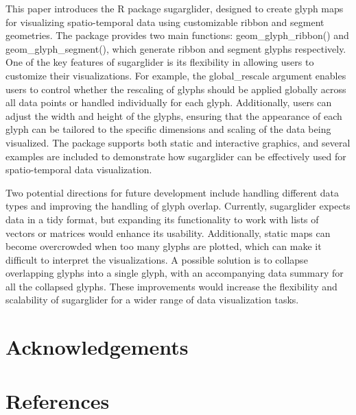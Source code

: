 This paper introduces the R package sugarglider, designed to create glyph maps for visualizing spatio-temporal data using customizable ribbon and segment geometries. The package provides two main functions: geom\_glyph\_ribbon() and geom\_glyph\_segment(), which generate ribbon and segment glyphs respectively. One of the key features of sugarglider is its flexibility in allowing users to customize their visualizations. For example, the global\_rescale argument enables users to control whether the rescaling of glyphs should be applied globally across all data points or handled individually for each glyph. Additionally, users can adjust the width and height of the glyphs, ensuring that the appearance of each glyph can be tailored to the specific dimensions and scaling of the data being visualized. The package supports both static and interactive graphics, and several examples are included to demonstrate how sugarglider can be effectively used for spatio-temporal data visualization.

Two potential directions for future development include handling different data types and improving the handling of glyph overlap. Currently, sugarglider expects data in a tidy format, but expanding its functionality to work with lists of vectors or matrices would enhance its usability. Additionally, static maps can become overcrowded when too many glyphs are plotted, which can make it difficult to interpret the visualizations. A possible solution is to collapse overlapping glyphs into a single glyph, with an accompanying data summary for all the collapsed glyphs. These improvements would increase the flexibility and scalability of sugarglider for a wider range of data visualization tasks.

\section{Acknowledgements}\label{acknowledgements}

\section*{References}\label{references}

